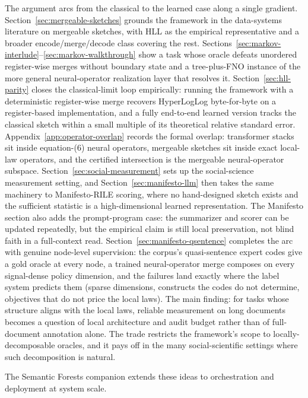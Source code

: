 The argument arcs from the classical to the learned case along a single
gradient. Section~\ref{sec:mergeable-sketches} grounds the framework in
the data-systems literature on mergeable sketches, with HLL as the
empirical representative and a broader encode/merge/decode class
covering the rest.
Sections~\ref{sec:markov-interlude}--\ref{sec:markov-walkthrough} show
a task whose oracle defeats unordered register-wise merges without
boundary state and a tree-plus-FNO
instance of the more general neural-operator realization layer that
resolves it. Section~\ref{sec:hll-parity} closes the
classical-limit loop empirically: running the framework with a
deterministic register-wise merge recovers HyperLogLog byte-for-byte on
a register-based implementation, and a fully end-to-end learned version
tracks the classical sketch within a small multiple of its theoretical
relative standard error. Appendix~\ref{app:operator-overlap} records the
formal overlap: transformer stacks sit inside equation-(6) neural
operators, mergeable sketches sit inside exact local-law operators, and
the certified intersection is the mergeable neural-operator subspace.
Section~\ref{sec:social-measurement} sets up the social-science
measurement setting, and Section~\ref{sec:manifesto-llm} then takes the
same machinery to Manifesto-RILE scoring, where no hand-designed sketch
exists and the sufficient statistic is a high-dimensional learned
representation. The Manifesto section also adds the prompt-program case: the
summarizer and scorer can be updated repeatedly, but the empirical claim
is still local preservation, not blind faith in a full-context read.
Section~\ref{sec:manifesto-qsentence} completes the arc with genuine
node-level supervision: the corpus's quasi-sentence expert codes give a
gold oracle at every node, a trained neural-operator merge composes on
every signal-dense policy dimension, and the failures land exactly
where the label system predicts them (sparse dimensions, constructs the
codes do not determine, objectives that do not price the local laws).
The main finding: for
tasks whose structure aligns with the local laws, reliable measurement
on long documents becomes a question of local architecture and audit
budget rather than of full-document annotation alone. The trade
restricts the framework's scope to locally-decomposable oracles, and it
pays off in the many social-scientific settings where such
decomposition is natural.

The Semantic Forests companion extends these ideas to orchestration
and deployment at system scale.
